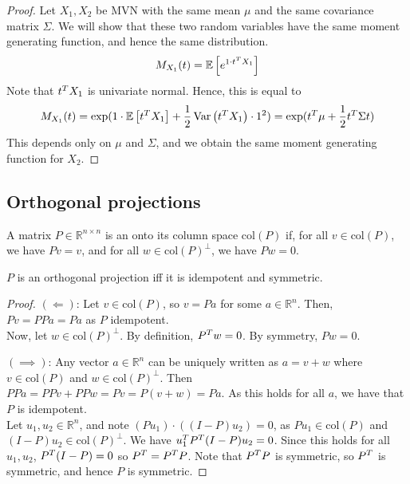 \begin{proof}
	Let $X_1, X_2$ be MVN with the same mean $\mu$ and the same covariance matrix $\Sigma$.
	We will show that these two random variables have the same moment generating function, and hence the same distribution.
	\begin{align*}
		M_{X_1}(t) = \mathbb{E}\left[{ e^{1 \cdot t^T X_1} }\right]
	\end{align*}
	Note that $t^T X_1$ is univariate normal.
	Hence, this is equal to
	\begin{align*}
		M_{X_1}(t) = \exp(1 \cdot \mathbb{E}\left[{t^T X_1}\right] + \frac{1}{2} \operatorname{Var}\left({t^T X_1}\right) \cdot 1^2) = \exp(t^T \mu + \frac{1}{2} t^T \Sigma t)
	\end{align*}
	This depends only on $\mu$ and $\Sigma$, and we obtain the same moment generating function for $X_2$.
\end{proof}

\subsection{Orthogonal projections}
\begin{definition}
	A matrix $P \in \mathbb R^{n \times n}$ is an  onto its column space $\mathrm{col}(P)$ if, for all $v \in \mathrm{col}(P)$, we have $Pv = v$, and for all $w \in \mathrm{col}(P)^\perp$, we have $Pw = 0$.
\end{definition}

\begin{proposition}
	$P$ is an orthogonal projection iff it is idempotent and symmetric.
\end{proposition}

\begin{proof}
	$(\Longleftarrow)$: Let $v \in \mathrm{col}(P)$, so $v = Pa$ for some $a \in \mathbb R^n$.
	Then, $Pv = PPa = Pa$ as $P$ idempotent. \\
	Now, let $w \in \mathrm{col}(P)^\perp$.
	By definition, $P^T w = 0$.
	By symmetry, $Pw = 0$.

	$(\implies)$: Any vector $a \in \mathbb R^n$ can be uniquely written as $a = v + w$ where $v \in \mathrm{col}(P)$ and $w \in \mathrm{col}(P)^\perp$.
	Then $PPa = PPv + PPw = Pv = P(v+w) = Pa$.
	As this holds for all $a$, we have that $P$ is idempotent. \\
	Let $u_1, u_2 \in \mathbb R^n$, and note $(P u_1) \cdot ((I-P) u_2) = 0$, as $P u_1 \in \mathrm{col}(P)$ and $(I-P) u_2 \in \mathrm{col}(P)^\perp$.
	We have $u_1^T P^T (I-P) u_2 = 0$.
	Since this holds for all $u_1, u_2$, $P^T (I-P) = 0$ so $P^T = P^T P$.
	Note that $P^T P$ is symmetric, so $P^T$ is symmetric, and hence $P$ is symmetric.
\end{proof}

